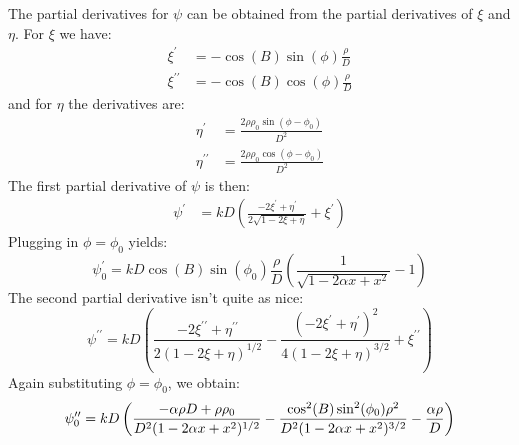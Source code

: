 \documentclass{article}
\begin{document}
        \par\hfill\par
        The partial derivatives for $\psi$ can be obtained from the partial
        derivatives of $\xi$ and $\eta$. For $\xi$ we have:
        \begin{align}
            \xi^{\prime}
            &=-\cos(B)\sin(\phi)\frac{\rho}{D}\\
            \xi^{\prime\prime}
            &=-\cos(B)\cos(\phi)\frac{\rho}{D}
        \end{align}
        and for $\eta$ the derivatives are:
        \begin{align}
            \eta^{\prime}
            &=\frac{2\rho\rho_{0}\sin(\phi-\phi_{0})}{D^{2}}\\
            \eta^{\prime\prime}
            &=\frac{2\rho\rho_{0}\cos(\phi-\phi_{0})}{D^{2}}
        \end{align}
        The first partial derivative of $\psi$ is then:
        \begin{align}
            \psi^{\prime}
            &=kD\left(
                \frac{-2\xi^{\prime}+\eta^{\prime}}{2\sqrt{1-2\xi+\eta}}
                +\xi^{\prime}
            \right)
        \end{align}
        Plugging in $\phi=\phi_{0}$ yields:
        \begin{equation}
            \psi^{\prime}_{0}
            =kD\cos(B)\sin(\phi_{0})\frac{\rho}{D}\left(
                \frac{1}{\sqrt{1-2\alpha{x}+x^{2}}}-1
            \right)
        \end{equation}
        The second partial derivative isn't quite as nice:
        \begin{equation}
            \psi^{\prime\prime}
            =kD\left(
                    \frac{-2\xi^{\prime\prime}+\eta^{\prime\prime}}
                          {2(1-2\xi+\eta)^{1/2}}-
                    \frac{(-2\xi^{\prime}+\eta^{\prime})^{2}}
                         {4(1-2\xi+\eta)^{3/2}}+
                    \xi^{\prime\prime}
            \right)
        \end{equation}
        Again substituting $\phi=\phi_{0}$, we obtain:
        \begin{equation}
            \psi^{\prime\prime}_{0}
            =kD\left(
                \frac{%
                    -\alpha\rho{D}+\rho\rho_{0}
                }{%
                    D^{2}(1-2\alpha{x}+x^{2})^{1/2}
                }
                -\frac{%
                    \cos^{2}(B)\sin^{2}(\phi_{0})\rho^{2}
                }{%
                    D^{2}(1-2\alpha{x}+x^{2})^{3/2}
                }
                -\frac{\alpha\rho}{D}
            \right)
        \end{equation}
\end{document}
